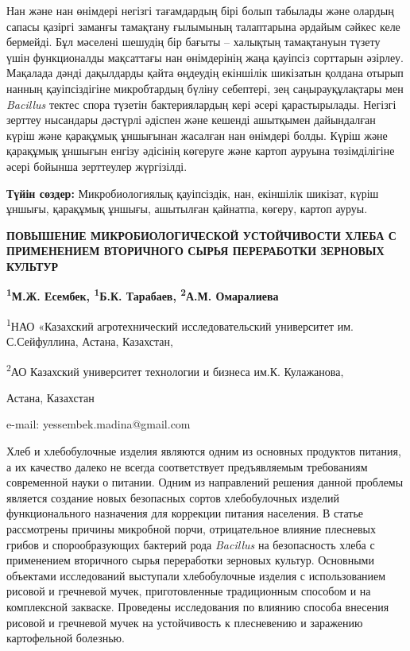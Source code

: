 Нан және нан өнімдері негізгі тағамдардың бірі болып табылады және
олардың сапасы қазіргі заманғы тамақтану ғылымының талаптарына әрдайым
сәйкес келе бермейді. Бұл мәселені шешудің бір бағыты -- халықтың
тамақтануын түзету үшін функционалды мақсаттағы нан өнімдерінің жаңа
қауіпсіз сорттарын әзірлеу. Мақалада дәнді дақылдарды қайта өңдеудің
екіншілік шикізатын қолдана отырып нанның қауіпсіздігіне микробтардың
бүліну себептері, зең саңырауқұлақтары мен \emph{Bacillus} тектес спора
түзетін бактериялардың кері әсері қарастырылады. Негізгі зерттеу
нысандары дәстүрлі әдіспен және кешенді ашытқымен дайындалған күріш және
қарақұмық ұншығынан жасалған нан өнімдері болды. Күріш және қарақұмық
ұншығын енгізу әдісінің көгеруге және картоп ауруына төзімділігіне әсері
бойынша зерттеулер жүргізілді.

{\bfseries Түйін сөздер:} Микробиологиялық қауіпсіздік, нан, екіншілік
шикізат, күріш ұншығы, қарақұмық ұншығы, ашытылған қайнатпа, көгеру,
картоп ауруы.

\begin{center}
{\large\bfseries ПОВЫШЕНИЕ МИКРОБИОЛОГИЧЕСКОЙ УСТОЙЧИВОСТИ ХЛЕБА С ПРИМЕНЕНИЕМ
ВТОРИЧНОГО СЫРЬЯ ПЕРЕРАБОТКИ ЗЕРНОВЫХ КУЛЬТУР}

{\bfseries \textsuperscript{1}М.Ж. Есембек\envelope, \textsuperscript{1}Б.К. Тарабаев, \textsuperscript{2}А.М. Омаралиева}

\textsuperscript{1}НАО «Казахский агротехнический исследовательский
университет им. С.Сейфуллина, Астана, Казахстан,

\textsuperscript{2}АО Казахский университет технологии и бизнеса им.К.
Кулажанова,

Астана, Казахстан

e-mail: yessembek.madina@gmail.com
\end{center}

Хлеб и хлебобулочные изделия являются одним из основных продуктов
питания, а их качество далеко не всегда соответствует предъявляемым
требованиям современной науки о питании. Одним из направлений решения
данной проблемы является создание новых безопасных сортов хлебобулочных
изделий функционального назначения для коррекции питания населения. В
статье рассмотрены причины микробной порчи, отрицательное влияние
плесневых грибов и спорообразующих бактерий рода \emph{Bacillus} на
безопасность хлеба с применением вторичного сырья переработки зерновых
культур. Основными объектами исследований выступали хлебобулочные
изделия с использованием рисовой и гречневой мучек, приготовленные
традиционным способом и на комплексной закваске. Проведены исследования
по влиянию способа внесения рисовой и гречневой мучек на устойчивость к
плесневению и заражению картофельной болезнью.

